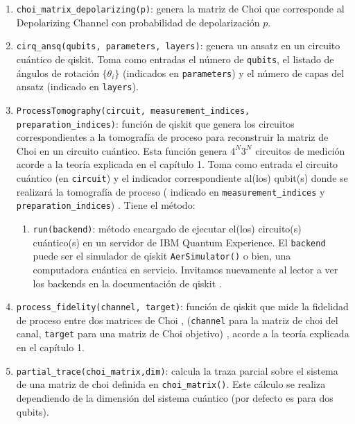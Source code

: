 \documentclass[letterpaper,12pt]{thesisECFM}
\theoremstyle{plain}
\theoremstyle{definition}
\theoremstyle{remark}
\newcommand{\1}{\mathbb{1}}
\begin{document}
\begin{enumerate}
    \item \texttt{choi\_matrix\_depolarizing(p)}: genera la matriz de Choi que
corresponde al Depolarizing Channel con probabilidad de depolarización $p$.

    \item \texttt{cirq\_ansq(qubits, parameters, layers)}: genera un ansatz en
un circuito cuántico de qiskit. Toma como entradas el número de
\texttt{qubits}, el listado de ángulos de rotación $\{\theta_i\}$ (indicados en
\texttt{parameters}) y el número de capas del ansatz (indicado en
\texttt{layers}).

    \item \texttt{ProcessTomography(circuit, measurement\_indices,
preparation\_indices)}: función de qiskit que genera los circuitos
correspondientes a la tomografía de proceso para reconstruir la matriz de Choi
en un circuito cuántico. Esta función genera $4^N3^N$ circuitos de medición
acorde a la teoría explicada en el capítulo 1. Toma como entrada el circuito
cuántico (en  \texttt{circuit})  y el indicador correspondiente al(los)
qubit(s) donde se realizará la tomografía de proceso ( indicado en
\texttt{measurement\_indices} y \texttt{preparation\_indices}) . Tiene el
método: 
    \begin{enumerate}
	\item \texttt{run(backend)}: método encargado de ejecutar el(los)
circuito(s) cuántico(s) en un servidor de IBM Quantum Experience. El
\texttt{backend} puede ser el simulador de qiskit  \texttt{AerSimulator()} o
bien, una computadora cuántica en servicio. Invitamos nuevamente al lector a
ver los backends en la documentación de qiskit \cite{qiskit_documentation}. 
    \end{enumerate}

    \item \texttt{process\_fidelity(channel, target)}: función de qiskit que
mide la fidelidad de proceso entre dos matrices de Choi , (\texttt{channel}
para la matriz de choi del canal, \texttt{target} para una matriz de Choi
objetivo) \cite{qiskit_documentation}, acorde a la teoría explicada en el
capítulo 1.

    \item \texttt{partial\_trace(choi\_matrix,dim)}: calcula la traza parcial
sobre el sistema de una matriz de choi definida en \texttt{choi\_matrix()}.
Este cálculo se realiza dependiendo de la dimensión del sistema cuántico (por
defecto es para dos qubits).
    

\end{enumerate}
\end{document}
